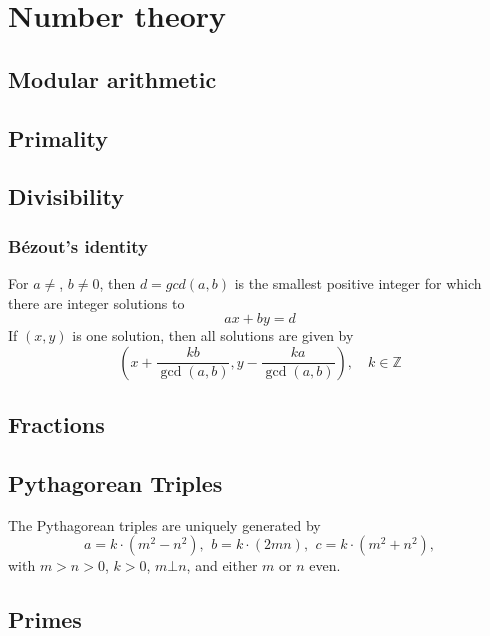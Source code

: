 \chapter{Number theory}

\section{Modular arithmetic}

\section{Primality}

\section{Divisibility}

	\subsection{Bézout's identity}
	For $a \neq $, $b \neq 0$, then $d=gcd(a,b)$ is the smallest positive integer for which there are integer solutions to
	$$ax+by=d$$
	If $(x,y)$ is one solution, then all solutions are given by
	$$\left(x+\frac{kb}{\gcd(a,b)}, y-\frac{ka}{\gcd(a,b)}\right), \quad k\in\mathbb{Z}$$


\section{Fractions}

\section{Pythagorean Triples}
 The Pythagorean triples are uniquely generated by
 \[ a=k\cdot (m^{2}-n^{2}),\ \,b=k\cdot (2mn),\ \,c=k\cdot (m^{2}+n^{2}), \]
 with $m > n > 0$, $k > 0$, $m \bot n$, and either $m$ or $n$ even.

\section{Primes}

